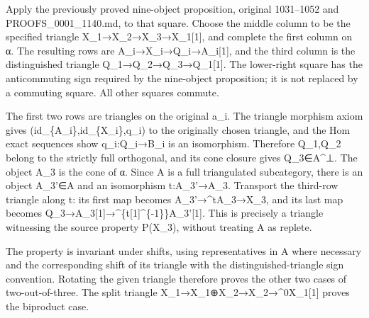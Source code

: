 \documentclass[11pt]{article}
\begin{document}
Apply the previously proved nine-object proposition,\allowbreak{} original 1031–\allowbreak{}1052 and PROOFS\_\allowbreak{}0001\_\allowbreak{}1140.md,\allowbreak{} to that square. Choose the middle column to be the specified triangle X\_\allowbreak{}1\allowbreak{}→X\_\allowbreak{}2\allowbreak{}→X\_\allowbreak{}3\allowbreak{}→X\_\allowbreak{}1[1]\allowbreak{},\allowbreak{} and complete the first column on α. The resulting rows are A\_\allowbreak{}i\allowbreak{}→X\_\allowbreak{}i\allowbreak{}→Q\_\allowbreak{}i\allowbreak{}→A\_\allowbreak{}i[1]\allowbreak{},\allowbreak{} and the third column is the distinguished triangle Q\_\allowbreak{}1\allowbreak{}→Q\_\allowbreak{}2\allowbreak{}→Q\_\allowbreak{}3\allowbreak{}→Q\_\allowbreak{}1[1]\allowbreak{}. The lower-right square has the anticommuting sign required by the nine-object proposition; it is not replaced by a commuting square. All other squares commute.

The first two rows are triangles on the original a\_\allowbreak{}i. The triangle morphism axiom gives (id\_\allowbreak{}\{A\_\allowbreak{}i\},\allowbreak{}id\_\allowbreak{}\{X\_\allowbreak{}i\},\allowbreak{}q\_\allowbreak{}i)\allowbreak{} to the originally chosen triangle,\allowbreak{} and the Hom exact sequences show q\_\allowbreak{}i:\allowbreak{}Q\_\allowbreak{}i\allowbreak{}→B\_\allowbreak{}i is an isomorphism. Therefore Q\_\allowbreak{}1,\allowbreak{}Q\_\allowbreak{}2 belong to the strictly full orthogonal,\allowbreak{} and its cone closure gives Q\_\allowbreak{}3\allowbreak{}∈A\textasciicircum{}⊥. The object A\_\allowbreak{}3 is the cone of α. Since A is a full triangulated subcategory,\allowbreak{} there is an object A\_\allowbreak{}3'\allowbreak{}∈A and an isomorphism t:\allowbreak{}A\_\allowbreak{}3'\allowbreak{}→A\_\allowbreak{}3. Transport the third-row triangle along t:\allowbreak{} its first map becomes A\_\allowbreak{}3'\allowbreak{}→\textasciicircum{}tA\_\allowbreak{}3\allowbreak{}→X\_\allowbreak{}3,\allowbreak{} and its last map becomes Q\_\allowbreak{}3\allowbreak{}→A\_\allowbreak{}3[1]\allowbreak{}\allowbreak{}→\textasciicircum{}\{t[1]\allowbreak{}\textasciicircum{}\{-1\}\}A\_\allowbreak{}3'[1]\allowbreak{}. This is precisely a triangle witnessing the source property P(X\_\allowbreak{}3)\allowbreak{},\allowbreak{} without treating A as replete.

The property is invariant under shifts,\allowbreak{} using representatives in A where necessary and the corresponding shift of its triangle with the distinguished-triangle sign convention. Rotating the given triangle therefore proves the other two cases of two-out-of-three. The split triangle X\_\allowbreak{}1\allowbreak{}→X\_\allowbreak{}1\allowbreak{}⊕X\_\allowbreak{}2\allowbreak{}→X\_\allowbreak{}2\allowbreak{}→\textasciicircum{}0X\_\allowbreak{}1[1]\allowbreak{} proves the biproduct case.
\end{document}
